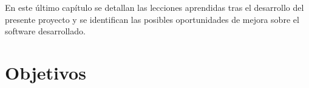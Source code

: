 

En este último capítulo se detallan las lecciones aprendidas tras el desarrollo
del presente proyecto y se identifican las posibles oportunidades de mejora
sobre el software desarrollado.

\section{Objetivos}

